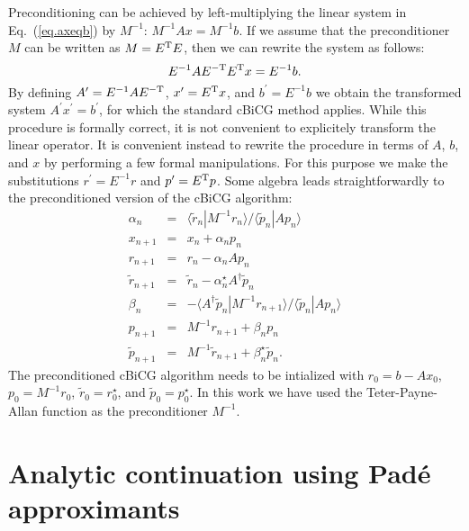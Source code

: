 \documentclass[twocolumn,prb,showpacs,superscriptaddress]{revtex4}
\def\>{\rangle}
\def\<{\langle}
\def\rt{\tilde{r}}
\def\pt{\tilde{p}}
\begin{document}
Preconditioning can be achieved by left-multiplying the linear system 
in Eq.\ (\ref{eq.axeqb}) 
by $M^{-1}$: $M^{-1}Ax=M^{-1}b$. If we assume that the preconditioner $M$ can be 
written as $M=E^{\rm T}E$, then we can rewrite the system as follows:
  \begin{equation}
  E^{-1}AE^{-{\rm T}} E^{\rm T}x = E^{-1}b.
  \end{equation}
By defining $A^\prime=E^{-1}AE^{-{\rm T}}$, $x^\prime=E^{\rm T}x$, and $b^\prime=E^{-1}b$
we obtain the transformed system $A^\prime x^\prime=b^\prime$, for which the
standard cBiCG method applies.
While this procedure is formally correct, it is not convenient to explicitely
transform the linear operator.
It is convenient instead to rewrite the procedure in terms of
$A$, $b$, and $x$ by performing a few formal manipulations.
For this purpose we make the substitutions
$r^\prime = E^{-1}r$ and $p^\prime=E^{\rm T} p$. Some algebra leads straightforwardly
to the preconditioned version of the cBiCG algorithm:
  \begin{eqnarray}
  \alpha_n & = & \<\rt_n|M^{-1}r_n\>/\<\pt_n|Ap_n\>  \\
  x_{n+1} & = & x_n + \alpha_n p_n \\ 
  r_{n+1} & = & r_n - \alpha_n Ap_n \\ 
  \rt_{n+1} & = & \rt_n - \alpha_n^\star A^\dagger \pt_n \\ 
  \beta_n & = & - \<A^\dagger\pt_n|M^{-1}r_{n+1}\>/\<\pt_n|Ap_n\> \\ 
  p_{n+1} & = & M^{-1}r_{n+1} + \beta_n p_n \\ 
  \pt_{n+1} & = & M^{-1}\rt_{n+1} + \beta_n^\star \pt_n.
  \end{eqnarray}
The preconditioned  cBiCG algorithm needs to be intialized with
$r_0=b-Ax_0$, $p_0=M^{-1}r_0$, $\rt_0=r_0^\star$, and $\pt_0=p_0^\star$.
In this work we have used the Teter-Payne-Allan function as the preconditioner 
$M^{-1}$.\cite{tpa}

\section{Analytic continuation using Pad\'e approximants}\label{app.pade}
\end{document}
